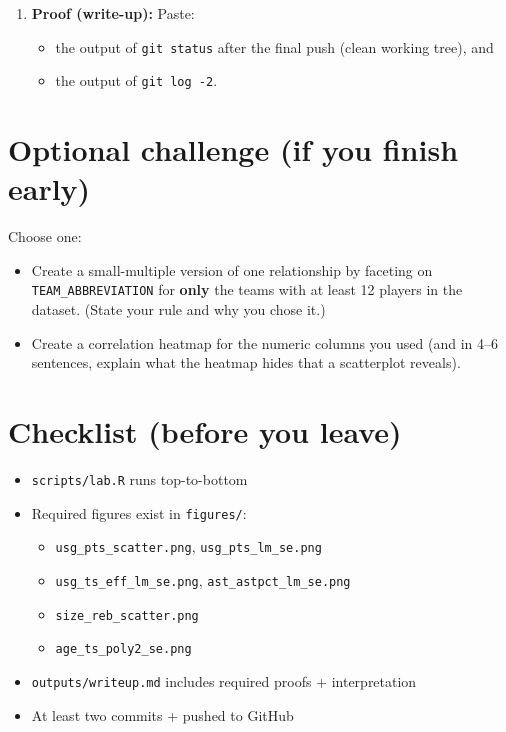 \documentclass[11pt]{article}
\begin{document}
\begin{enumerate}
\begin{enumerate}
    \item \textbf{Proof (write-up):} Paste:
    \begin{itemize}
      \item the output of \texttt{git status} after the final push (clean working tree), and
      \item the output of \texttt{git log -2}.
    \end{itemize}
  \end{enumerate}

\end{enumerate}

\section*{Optional challenge (if you finish early)}
Choose one:
\begin{itemize}
  \item Create a small-multiple version of one relationship by faceting on \texttt{TEAM\_ABBREVIATION} for \textbf{only} the teams with at least 12 players in the dataset. (State your rule and why you chose it.)
  \item Create a correlation heatmap for the numeric columns you used (and in 4--6 sentences, explain what the heatmap hides that a scatterplot reveals).
\end{itemize}

\section*{Checklist (before you leave)}
\begin{itemize}
  \item \texttt{scripts/lab.R} runs top-to-bottom
  \item Required figures exist in \texttt{figures/}:
  \begin{itemize}
    \item \texttt{usg\_pts\_scatter.png}, \texttt{usg\_pts\_lm\_se.png}
    \item \texttt{usg\_ts\_eff\_lm\_se.png}, \texttt{ast\_astpct\_lm\_se.png}
    \item \texttt{size\_reb\_scatter.png}
    \item \texttt{age\_ts\_poly2\_se.png}
  \end{itemize}
  \item \texttt{outputs/writeup.md} includes required proofs + interpretation
  \item At least two commits + pushed to GitHub
\end{itemize}
\end{document}
